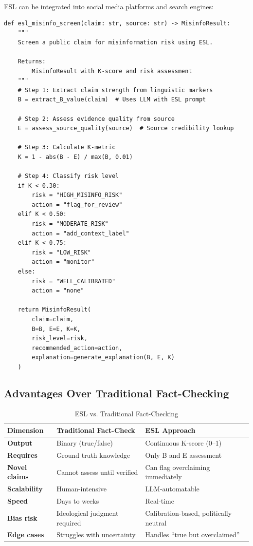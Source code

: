 \documentclass[11pt,a4paper]{article}
\begin{document}
ESL can be integrated into social media platforms and search engines:

\begin{lstlisting}[style=pythonstyle, caption={ESL Misinformation Screening Module}]
def esl_misinfo_screen(claim: str, source: str) -> MisinfoResult:
    """
    Screen a public claim for misinformation risk using ESL.

    Returns:
        MisinfoResult with K-score and risk assessment
    """
    # Step 1: Extract claim strength from linguistic markers
    B = extract_B_value(claim)  # Uses LLM with ESL prompt

    # Step 2: Assess evidence quality from source
    E = assess_source_quality(source)  # Source credibility lookup

    # Step 3: Calculate K-metric
    K = 1 - abs(B - E) / max(B, 0.01)

    # Step 4: Classify risk level
    if K < 0.30:
        risk = "HIGH_MISINFO_RISK"
        action = "flag_for_review"
    elif K < 0.50:
        risk = "MODERATE_RISK"
        action = "add_context_label"
    elif K < 0.75:
        risk = "LOW_RISK"
        action = "monitor"
    else:
        risk = "WELL_CALIBRATED"
        action = "none"

    return MisinfoResult(
        claim=claim,
        B=B, E=E, K=K,
        risk_level=risk,
        recommended_action=action,
        explanation=generate_explanation(B, E, K)
    )
\end{lstlisting}

\subsection{Advantages Over Traditional Fact-Checking}

\begin{table}[H]
\centering
\caption{ESL vs. Traditional Fact-Checking}
\begin{tabular}{p{4cm}p{4.5cm}p{4.5cm}}
\toprule
\textbf{Dimension} & \textbf{Traditional Fact-Check} & \textbf{ESL Approach} \\
\midrule
\textbf{Output} & Binary (true/false) & Continuous K-score (0--1) \\
\textbf{Requires} & Ground truth knowledge & Only B and E assessment \\
\textbf{Novel claims} & Cannot assess until verified & Can flag overclaiming immediately \\
\textbf{Scalability} & Human-intensive & LLM-automatable \\
\textbf{Speed} & Days to weeks & Real-time \\
\textbf{Bias risk} & Ideological judgment required & Calibration-based, politically neutral \\
\textbf{Edge cases} & Struggles with uncertainty & Handles ``true but overclaimed'' \\
\bottomrule
\end{tabular}
\end{table}
\end{document}
